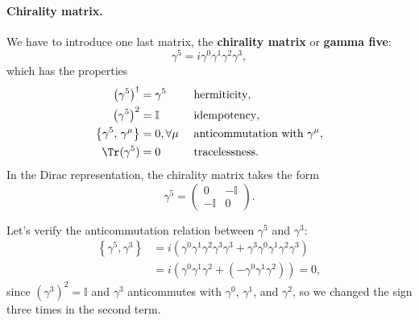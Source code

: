\paragraph{Chirality matrix.}
We have to introduce one last matrix, the \textbf{chirality matrix} or \textbf{gamma five}:
\begin{equation}
    \gamma^5 = i \gamma^0 \gamma^1 \gamma^2 \gamma^3,
    \label{eq:chirality_matrix}
\end{equation}
which has the properties
\[
    \begin{aligned}
        \left(\gamma^5\right)^{\dagger}         & = \gamma^5       &  & \text{ hermiticity},                        \\
        \left(\gamma^5\right)^2                 & = \mathbb{I}     &  & \text{ idempotency},                        \\
        \left\{\gamma^5,\, \gamma^{\mu}\right\} & = 0, \forall \mu &  & \text{ anticommutation with } \gamma^{\mu}, \\
        \Tr(\gamma^5)                           & = 0              &  & \text{ tracelessness}.
    \end{aligned}
\]
In the Dirac representation, the chirality matrix takes the form
\[
    \gamma^5 = \begin{pmatrix}
        0           & -\mathbb{I} \\
        -\mathbb{I} & 0
    \end{pmatrix}.
\]

\begin{example}
    Let's verify the anticommutation relation between \(\gamma^5\) and \(\gamma^{3}\):
    \[
        \begin{aligned}
            \left\{\gamma^5, \gamma^{3}\right\} & = i \left(\gamma^0 \gamma^1 \gamma^2 \gamma^3 \gamma^3 + \gamma^3 \gamma^0 \gamma^1 \gamma^2 \gamma^3\right) \\
                                                & = i \left(\gamma^0 \gamma^1 \gamma^2 + (-\gamma^0 \gamma^1 \gamma^2)\right) = 0,
        \end{aligned}
    \]
    since \((\gamma^3)^2 = \mathbb{I}\) and \(\gamma^3\) anticommutes with \(\gamma^0\), \(\gamma^1\), and \(\gamma^2\), so we changed the sign three times in the second term.
\end{example}

